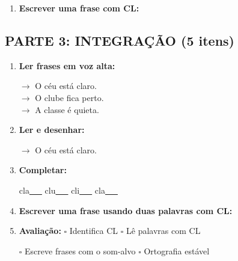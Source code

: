 \begin{exercicio}
\begin{enumerate}[resume]
  \item \textbf{Escrever uma frase com CL:}
  \begin{center}
  \underline{\hspace{12cm}}
  \end{center}

\end{enumerate}

\subsection*{PARTE 3: INTEGRAÇÃO (5 itens)}

\begin{enumerate}[resume]

  \item \textbf{Ler frases em voz alta:}
  \begin{center}
  $\rightarrow$ O céu está claro.\\
  $\rightarrow$ O clube fica perto.\\
  $\rightarrow$ A classe é quieta.\\
  \end{center}

  \item \textbf{Ler e desenhar:}
  \begin{center}
  $\rightarrow$ O céu está claro.
  \end{center}
  \begin{center}
  \end{center}

  \item \textbf{Completar:}
  \begin{center}
  cla\underline{~~~} \quad clu\underline{~~~} \quad cli\underline{~~~} \quad cla\underline{~~~}
  \end{center}

  \item \textbf{Escrever uma frase usando duas palavras com CL:}
  \begin{center}
  \underline{\hspace{12cm}}
  \end{center}

  \item \textbf{Avaliação:} $\square$ Identifica CL \quad $\square$ Lê palavras com CL
  \begin{center}
  $\square$ Escreve frases com o som-alvo \quad $\square$ Ortografia estável
  \end{center}


\end{enumerate}
\end{exercicio}
